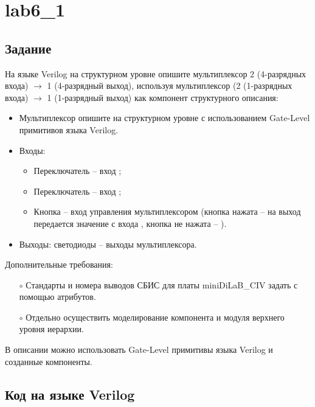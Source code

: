 





\tableofcontents
\newpage
\listoffigures
\lstlistoflistings
\newpage

\section{lab6\_1}

\subsection{Задание}

На языке Verilog на структурном уровне опишите мультиплексор 2 (4-разрядных входа) $\rightarrow$ 1 (4-разрядный выход), используя мультиплексор  (2 (1-разрядных входа) $\rightarrow$ 1 (1-разрядный выход) как компонент структурного описания:
\begin{itemize}
	\item Мультиплексор  опишите на структурном уровне с использованием Gate-Level примитивов языка Verilog.
	\item Входы:
		\begin{itemize}
			\item Переключатель  -- вход ;
			\item Переключатель  -- вход ;
			\item Кнопка  – вход управления мультиплексором (кнопка нажата – на выход передается значение с входа , кнопка не нажата -- ).
		\end{itemize}
	\item Выходы: светодиоды  – выходы мультиплексора.
\end{itemize}
Дополнительные требования:
\begin{itemize}
	\item[$\circ$] Стандарты и номера выводов СБИС для платы miniDiLaB\_CIV задать с помощью атрибутов.
	\item[$\circ$] Отдельно осуществить моделирование компонента  и модуля верхнего уровня иерархии.
\end{itemize}
В описании можно использовать Gate-Level примитивы языка Verilog и созданные компоненты.

\subsection{Код на языке Verilog}

